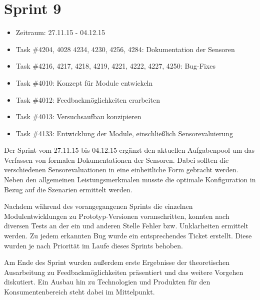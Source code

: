 \documentclass[12pt, oneside, smallheadings]{scrbook}
\begin{document}
\section{Sprint 9}
\begin{itemize}
	\item Zeitraum: 27.11.15 - 04.12.15 \newline
	\item Task \#4204, 4028 4234, 4230, 4256, 4284: Dokumentation der Sensoren
	\item Task \#4216, 4217, 4218, 4219, 4221, 4222, 4227, 4250: Bug-Fixes
	\item Task \#4010: Konzept für Module entwickeln
	\item Task \#4012: Feedbackmöglichkeiten erarbeiten
	\item Task \#4013: Versuchsaufbau konzipieren
	\item Task \#4133: Entwicklung der Module, einschließlich Sensorevaluierung\\
\end{itemize}
\noindent
Der Sprint vom 27.11.15 bis 04.12.15 ergänzt den aktuellen Aufgabenpool um das Verfassen von formalen  Dokumentationen der Sensoren. Dabei sollten die verschiedenen Sensorevaluationen in eine einheitliche Form gebracht werden. Neben den allgemeinen Leistungsmerkmalen musste die optimale Konfiguration in Bezug auf die Szenarien ermittelt werden.

Nachdem während des vorangegangenen Sprints die einzelnen Modulentwicklungen zu Prototyp-Versionen voranschritten, konnten nach diversen Tests an der ein und anderen Stelle Fehler bzw. Unklarheiten ermittelt werden. Zu jedem erkannten Bug wurde ein entsprechendes Ticket erstellt. Diese wurden je nach Priorität im Laufe dieses Sprints behoben.

Am Ende des Sprint wurden außerdem erste Ergebnisse der theoretischen Ausarbeitung zu Feedbackmöglichkeiten präsentiert und das weitere Vorgehen diskutiert. Ein Ausbau hin zu Technologien und Produkten für den Konsumentenbereich steht dabei im Mittelpunkt.
\end{document}
